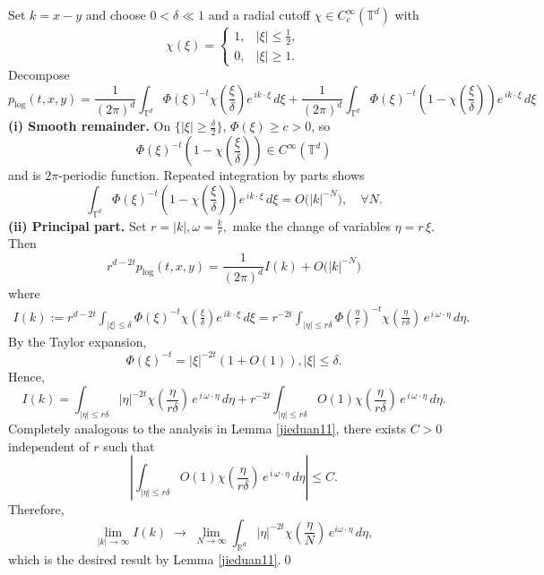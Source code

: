 \documentclass[reqno,12pt]{amsart}
\numberwithin{equation}{section}
\begin{document}
Set $k=x-y$ and choose \(0<\delta\ll1\) and a radial cutoff 
\(\chi\in C_c^\infty(\mathbb{T}^d)\) with
\[
\chi(\xi)=
\begin{cases}
	1,&|\xi|\le\tfrac12,\\
	0,&|\xi|\ge1.
\end{cases}
\]
Decompose
\begingroup\small\[
p_{\log}(t,x,y)=\frac{1}{(2\pi)^d}
\int_{\mathbb{T}^d}
\Phi(\xi)^{-t}\chi\left(\frac{\xi}{\delta}\right)e^{\,ik\cdot\xi}\,d\xi+\frac{1}{(2\pi)^d}
\int_{\mathbb{T}^d}
\Phi(\xi)^{-t}\left(1-\chi\left(\frac{\xi}{\delta}\right)\right)e^{\,ik\cdot\xi}\,d\xi
\]\endgroup
{\bf (i) Smooth remainder.}  On \(\{|\xi|\ge\tfrac\delta2\}\),
\(\Phi(\xi)\ge c>0\), so 
\[\Phi(\xi)^{-t}\left(1-\chi\left(\frac{\xi}{\delta}\right)\right)\in C^\infty(\mathbb{T}^d)\] 
and is $2\pi$-periodic function. Repeated integration by parts shows \cite[Theorem 3.2.9]{grafakos2008classical}
\[
\int_{\mathbb{T}^d}
\Phi(\xi)^{-t}\left(1-\chi\left(\frac{\xi}{\delta}\right)\right)e^{\,ik\cdot\xi}\,d\xi
=O\bigl(|k|^{-N}\bigr),
\quad\forall N.
\]
\textbf{(ii) Principal part.}  Set $	r = |k|, \omega = \frac{k}{r},$ make the change of variables \(\eta = r\,\xi\).  Then
\[
r^{d-2t}	p_{\log}(t,x,y)=\frac{1}{(2\pi)^d}I(k)+O\bigl(|k|^{-N}\bigr)\]
where 
	\begingroup\small\[
\begin{aligned}
	I(k):=r^{d-2t}
	\int_{|\xi|\le \delta}
\Phi(\xi)^{-t}\chi\left(\frac{\xi}{\delta}\right)e^{\,ik\cdot\xi}\,d\xi= r^{-2t}
	\int_{|\eta|\le r\delta}
\Phi(\frac{\eta}{r})^{-t}\chi\left(\frac{\eta}{r\delta}\right)\,
	e^{\,i\,\omega\cdot\eta}\,
	d\eta.
\end{aligned}
\]\endgroup
By the Taylor expansion,
\[\Phi(\xi)^{-t}=|\xi|^{-2t}\left(1+O\left(1\right)\right),|\xi|\le \delta.\]
Hence,
\[I\left(k\right)=	\int_{|\eta|\le r\delta}
|\eta|^{-2t}\chi\left(\frac{\eta}{r\delta}\right)\,
e^{\,i\,\omega\cdot\eta}\,
d\eta+r^{-2t}\int_{|\eta|\le r\delta}
O\left(1\right)\chi\left(\frac{\eta}{r\delta}\right)\,
e^{\,i\,\omega\cdot\eta}\,
d\eta.\]
Completely analogous to the analysis in Lemma \ref{jieduan11}, there exists $C>0$ independent of $r$ such that
\[\left|\int_{|\eta|\le r\delta}
O\left(1\right)\chi\left(\frac{\eta}{r\delta}\right)\,
e^{\,i\,\omega\cdot\eta}\,
d\eta\right|\le C.\]
Therefore, 
\[
\lim\limits_{|k|\rightarrow \infty}I(k)\;\longrightarrow\;
\lim\limits_{N\rightarrow \infty}
\int_{\mathbb{R}^d}|\eta|^{-2t}\chi\left(\frac{\eta}{N}\right)\,e^{i\omega\cdot\eta}\,d\eta,
\]
which is the desired result by Lemma \ref{jieduan11}.\qed
\end{document}
